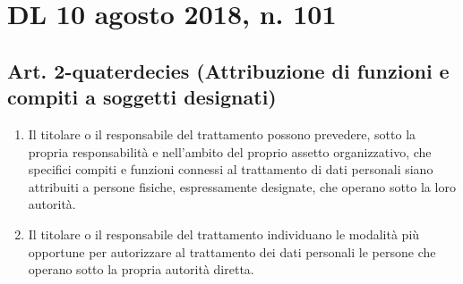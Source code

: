 \section*{DL 10 agosto 2018, n. 101}
\subsection*{Art. 2-quaterdecies (Attribuzione  di funzioni e compiti a soggetti designati)}
\begin{enumerate}\label{sec:DL10agosto2018n101Art2quaterdecies}
	\item Il  titolare  o  il
	responsabile del trattamento  possono  prevedere,  sotto  la  propria
	responsabilità e nell'ambito del proprio assetto organizzativo,  che
	specifici  compiti  e  funzioni  connessi  al  trattamento  di   dati
	personali  siano  attribuiti   a   persone   fisiche,   espressamente
	designate, che operano sotto la loro autorità.
	\item Il titolare o il responsabile  del  trattamento  individuano  le
	modalità più opportune per  autorizzare  al  trattamento  dei  dati
	personali le persone che operano sotto la propria autorità diretta. 
\end{enumerate}